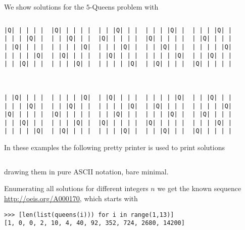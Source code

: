 
\begin{example}
We show solutions for the $5$-Queens problem with
\inputminted[fontsize=\small,]{python}{backtracking/5queens-enumeration-snippet.py}
\begin{Verbatim}[baselinestretch=0.1, fontsize=\small]
|Q| | | | |  |Q| | | | |  | | |Q| | |  | | | |Q| |  | | | |Q| |
| | | |Q| |  | | |Q| | |  |Q| | | | |  |Q| | | | |  | |Q| | | |
| |Q| | | |  | | | | |Q|  | | | |Q| |  | | |Q| | |  | | | | |Q|
| | | | |Q|  | |Q| | | |  | |Q| | | |  | | | | |Q|  | | |Q| | |
| | |Q| | |  | | | |Q| |  | | | | |Q|  | |Q| | | |  |Q| | | | |



| |Q| | | |  | | | | |Q|  | |Q| | | |  | | | | |Q|  | | |Q| | |
| | | |Q| |  | | |Q| | |  | | | | |Q|  | |Q| | | |  | | | | |Q|
|Q| | | | |  |Q| | | | |  | | |Q| | |  | | | |Q| |  | |Q| | | |
| | |Q| | |  | | | |Q| |  |Q| | | | |  |Q| | | | |  | | | |Q| |
| | | | |Q|  | |Q| | | |  | | | |Q| |  | | |Q| | |  |Q| | | | |
\end{Verbatim}
\end{example}

In these examples the following pretty printer is used to print solutions
\inputminted[fontsize=\small,firstline=30, lastline=39]{python}{backtracking/queens.py}
\noindent drawing them in pure ASCII notation, bare minimal.

Enumerating all solutions for different integers $n$ we get the known sequence
\url{http://oeis.org/A000170}, which starts with
\begin{verbatim}
>>> [len(list(queens(i))) for i in range(1,13)]
[1, 0, 0, 2, 10, 4, 40, 92, 352, 724, 2680, 14200]
\end{verbatim}

